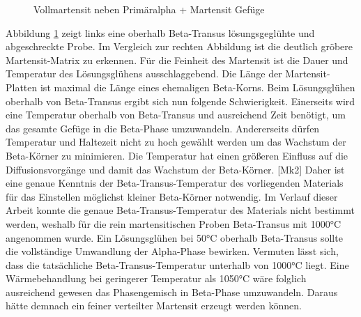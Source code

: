 \documentclass[a4paper, 11pt]{tubsreprt}
\begin{document}
\begin{figure}
\caption{Vollmartensit neben Primäralpha + Martensit Gefüge}
\label{Vollmartensit neben 960}
\end{figure}
Abbildung \ref{Vollmartensit neben 960} zeigt links eine oberhalb Beta-Transus lösungsgeglühte und abgeschreckte Probe. Im Vergleich zur rechten Abbildung ist die deutlich gröbere Martensit-Matrix zu erkennen. Für die Feinheit des Martensit ist die Dauer und Temperatur des Lösungsglühens ausschlaggebend. Die Länge der Martensit-Platten ist maximal die Länge eines ehemaligen Beta-Korns. Beim Lösungsglühen oberhalb von Beta-Transus ergibt sich nun folgende Schwierigkeit. Einerseits wird eine Temperatur oberhalb von Beta-Transus und ausreichend Zeit benötigt, um das gesamte Gefüge in die Beta-Phase umzuwandeln. Andererseits dürfen Temperatur und Haltezeit nicht zu hoch gewählt werden um das Wachstum der Beta-Körner zu minimieren. Die Temperatur hat einen größeren Einfluss auf die Diffusionsvorgänge und damit das Wachstum der Beta-Körner. [Mk2] Daher ist eine genaue Kenntnis der Beta-Transus-Temperatur des vorliegenden Materials für das Einstellen möglichst kleiner Beta-Körner notwendig.
Im Verlauf dieser Arbeit konnte die genaue Beta-Transus-Temperatur des Materials nicht bestimmt werden, weshalb für die rein martensitischen Proben Beta-Transus mit 1000°C angenommen wurde. Ein Lösungsglühen bei 50°C oberhalb Beta-Transus sollte die vollständige Umwandlung der Alpha-Phase bewirken. Vermuten lässt sich, dass die tatsächliche Beta-Transus-Temperatur unterhalb von 1000°C liegt. Eine Wärmebehandlung bei geringerer Temperatur als 1050°C wäre folglich ausreichend gewesen das Phasengemisch in Beta-Phase umzuwandeln. Daraus hätte demnach ein feiner verteilter Martensit erzeugt werden können. 
\end{document}
